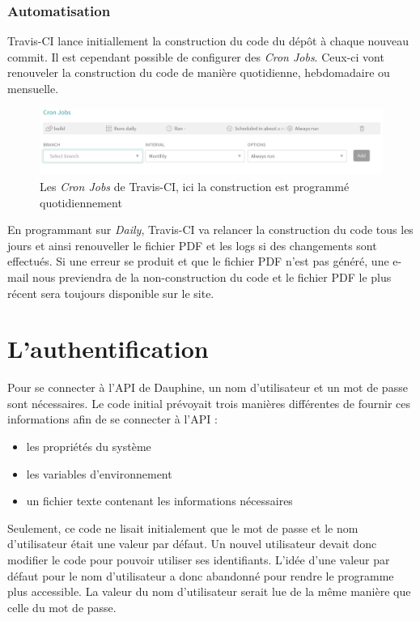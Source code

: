 \subsubsection*{Automatisation}
Travis-CI lance initiallement la construction du code du dépôt à chaque nouveau commit. Il est cependant possible de configurer des \textit{Cron Jobs}. Ceux-ci vont renouveler la construction du code de manière quotidienne, hebdomadaire ou mensuelle. 

\begin{figure}[!ht]
    \begin{center}\includegraphics[width=\textwidth]{assets/CronJobs.PNG}
    \end{center}
    \caption{Les \textit{Cron Jobs} de Travis-CI, ici la construction est programmé quotidiennement}
\end{figure}

En programmant sur \textit{Daily}, Travis-CI va relancer la construction du code tous les jours et ainsi renouveller le fichier PDF et les logs si des changements sont effectués. Si une erreur se produit et que le fichier PDF n'est pas généré, une e-mail nous previendra de la non-construction du code et le fichier PDF le plus récent sera toujours disponible sur le site.

\section{L'authentification}

Pour se connecter à l'API de Dauphine, un nom d'utilisateur et un mot de passe sont nécessaires. Le code initial prévoyait trois manières différentes de fournir ces informations afin de se connecter à l'API :
\begin{itemize}
    \item les propriétés du système
    \item les variables d'environnement
    \item un fichier texte contenant les informations nécessaires
\end{itemize}

Seulement, ce code ne lisait initialement que le mot de passe et le nom d'utilisateur était une valeur par défaut. Un nouvel utilisateur devait donc modifier le code pour pouvoir utiliser ses identifiants. L'idée d'une valeur par défaut pour le nom d'utilisateur a donc abandonné pour rendre le programme plus accessible. La valeur du nom d'utilisateur serait lue de la même manière que celle du mot de passe.

